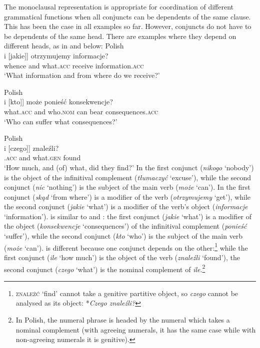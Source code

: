 \documentclass[output=paper]{../langscibook}
\begin{document}
The monoclausal representation is appropriate for coordination of
different grammatical functions when all conjuncts can be dependents
of the same clause. This has been the case in all examples so
far. However, conjuncts do not have to be dependents of the same head.
There are examples where they depend on different heads, as in
 and below:
\ea\label{ex:Patejuk2015:5.5}
    Polish\\\gll
      [[Skąd] i [jakie]] otrzymujemy informacje? \\
      \phtm{[[}whence and \phtm{[}what.\textsc{acc} receive information.\textsc{acc}\\
\glt`What information and from where do we receive?'\nkjp
%
\newpage
  \item\label{ex:Patejuk2015:5.96}
    Polish\\\gll
      [[Jakie] i [kto]] może ponieść konsekwencje? \\
      \phtm{[[}what.\textsc{acc} and \phtm{[}who.\textsc{nom} can bear consequences.\textsc{acc}\\
\glt `Who can suffer what consequences?'\ggl
  \item\label{ex:Patejuk2015:5.6}
    Polish\\\gll
      [[Ile] i [czego]] znaleźli? \\
      \phtm{[[}{how much}.\textsc{acc} and \phtm{[}what.\textsc{gen} found\\
\glt`How much, and (of) what, did they find?'\nkjp
\z
In  the first conjunct
(\emph{nikogo} `nobody') is the object of the infinitival complement
(\emph{tłumaczyć} `excuse'), while the second conjunct (\emph{nic} `nothing') is the subject
of the main verb (\emph{może} `can').
%
In  the first conjunct (\emph{skąd} `from where')
is a modifier of the verb (\emph{otrzymujemy} `get'), while the second
conjunct (\emph{jakie} `what') is a modifier of the verb's object
(\emph{informacje} `information').
%
 is similar to
 and : the
first conjunct (\emph{jakie} `what') is a modifier of the object
(\emph{konsekwencje} `consequences') of the infinitival complement
(\emph{ponieść} `suffer'), while the second conjunct (\emph{kto}
`who') is the subject of the main verb (\emph{może} `can').
%
 is different because one
conjunct depends on the other:\footnote{\textsc{znaleźć}
  `find' cannot take a genitive partitive object, so \emph{czego} cannot be analysed as its object: *\emph{Czego znaleźli?}} while the first conjunct (\emph{ile}
`how much') is the object of the verb (\emph{znaleźli} `found'), the
second conjunct (\emph{czego} `what') is the nominal complement of
\emph{ile}.\footnote{In Polish, the numeral phrase is headed by the
  numeral which takes a nominal complement (with agreeing numerals,
  it has the same case while with non-agreeing numerals it is genitive).}
\end{document}
